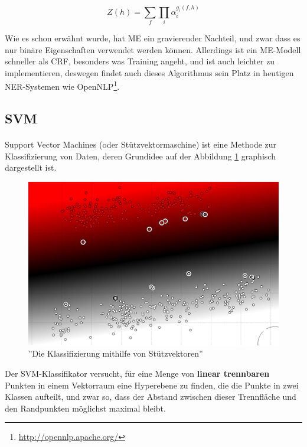 \begin{equation} \label{eq:zeteqme}
Z(h) = \sum_f \prod_i \alpha_i^{g_i(f,h)}
\end{equation}

Wie es schon erwähnt wurde, hat ME ein gravierender Nachteil, und zwar dass es nur binäre Eigenschaften verwendet werden können. Allerdings ist ein ME-Modell schneller als CRF, besonders was Training angeht, und ist auch leichter zu implementieren, deswegen findet auch dieses Algorithmus sein Platz in heutigen NER-Systemen wie OpenNLP\footnote{\url{http://opennlp.apache.org/}}.

\subsection{SVM}
\paragraph{}
Support Vector Machines (oder Stützvektormaschine) ist eine Methode zur Klassifizierung von Daten, deren Grundidee\cite{meyer2014support} auf der Abbildung \ref{fig:SVM-INTRO} graphisch dargestellt ist. 

\begin{figure}
\centering
\includegraphics[width=\textwidth,angle=90]{Bilder/svm-intro.png}
\caption{''Die Klassifizierung mithilfe von Stützvektoren''}
\label{fig:SVM-INTRO}
\end{figure}

Der SVM-Klassifikator versucht, für eine Menge von \textbf{linear trennbaren} Punkten in einem Vektorraum eine Hyperebene zu finden, die die Punkte in zwei Klassen aufteilt, und zwar so, dass der Abstand zwischen dieser Trennfläche und den Randpunkten möglichst maximal bleibt.

